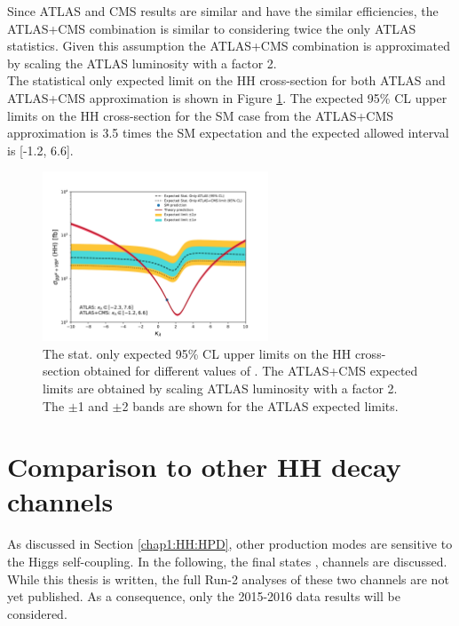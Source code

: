 Since ATLAS and CMS results are similar and have the similar efficiencies, the ATLAS+CMS \HHyybb combination is similar to considering twice the only ATLAS statistics. Given this assumption the ATLAS+CMS combination is approximated by scaling the ATLAS \HHyybb luminosity with a factor 2. \\
The statistical only expected limit on the HH cross-section for both ATLAS and ATLAS+CMS approximation is shown in Figure \ref{fig:HHyybb:CMS+ATLAS}. The expected 95\% CL upper limits on the HH cross-section for the SM case from the ATLAS+CMS approximation is 3.5 times the SM expectation and the expected allowed \kl interval is [-1.2, 6.6]. 

\begin{figure}[htbp]
    \centering
    \includegraphics[width=0.6\textwidth]{Ch5/Img/kappa_lambda_ATLAS_CMS_stat.pdf}
    \begin{tcolorbox}[colback=black!5!white, colframe=white!75!black]
    \caption{The stat. only expected 95\% CL upper limits on the HH cross-section obtained for different values of \kl. The ATLAS+CMS expected limits are obtained by scaling ATLAS luminosity with a factor 2. The $\pm$1 and $\pm$2 bands are shown for the ATLAS expected limits.}
    \label{fig:HHyybb:CMS+ATLAS}
    \end{tcolorbox}
\end{figure}


\section{Comparison to other HH decay channels}
\label{HHyybb:HH}
As discussed in Section \ref{chap1:HH:HPD}, other production modes are sensitive to the Higgs self-coupling. In the following, the final states \bbbb, \bbtt channels are discussed. While this thesis is written, the full Run-2 analyses of these two channels are not yet published. As a consequence, only the 2015-2016 data results will be considered.

